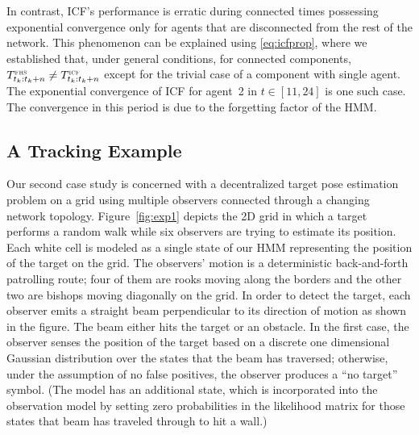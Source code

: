 \documentclass[journal]{IEEEtran}
\theoremstyle{remark}
\newcommand{\suf}[1]{\textsc{\tiny #1}}  %
\theoremstyle{definition}
\begin{document}
In contrast, ICF's performance is erratic during connected times possessing
exponential convergence only for agents that are disconnected from the rest of
the network.  This phenomenon can be explained using \eqref{eq:icfprop}, where
we established that, under general conditions, for connected components, $
T^{\suf{FHS}}_{t_{k}:t_{k}+n}\neq T^{\suf{ICF}}_{t_{k}:t_{k}+n}$ except for the
trivial case of a component with single agent. The exponential convergence of
ICF for agent~2 in $t\in[11,24]$ is one such case. The convergence in this
period is due to the forgetting factor of the HMM.


\subsection{A Tracking Example} \label{subsec:studyB}

Our second case study is concerned with a decentralized target pose estimation
problem on a grid using multiple observers connected through a changing
network topology. Figure~\ref{fig:exp1} depicts the 2D grid in which a target
performs a random walk while six observers are trying to estimate its position. 
Each white cell is modeled as a single state of our HMM representing the 
position of the target on the grid. The observers' motion is a deterministic
back-and-forth patrolling route; four of them are rooks moving along the
borders and the other two are bishops moving diagonally on the grid. In order
to detect the target, each observer 
emits a straight beam perpendicular to its direction of motion as shown in the 
figure. The beam either hits the target or an obstacle. In the first case, the 
observer senses the position of the target 
based on a discrete one dimensional Gaussian distribution over the states that 
the beam has traversed; otherwise, under the assumption of no false 
positives, the observer produces a ``no target'' symbol. (The model
has an additional state, which is incorporated into the observation model by
setting zero probabilities in the likelihood matrix for those states that beam
has traveled through to hit a wall.)
\end{document}
